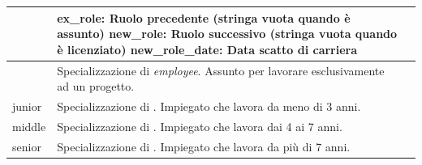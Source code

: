 \begin{longtable}{@{}| p{} | p{} | p{} |}
\begin{minipage}[t]{0.4\textwidth}
	                       \end{minipage}
	                     & \begin{minipage}[t]{0.3\textwidth}
		                       \raggedright
		                       \textbf{ex\_role}: Ruolo precedente (stringa vuota quando è assunto)\sskip
		                       \textbf{new\_role}: Ruolo successivo (stringa vuota quando è licenziato)\sskip
		                       \textbf{new\_role\_date}: Data scatto di carriera
	                       \end{minipage}                                     \\[90pt]
	\hline
	\projectsalaried     & \begin{minipage}[t]{0.4\textwidth}
		                       \raggedright
		                       Specializzazione di \textit{employee}. Assunto per lavorare esclusivamente ad un progetto.
	                       \end{minipage}
	                     &                                                                                                                   \\[25pt]
	\hline
	junior               & \begin{minipage}[t]{0.4\textwidth}
		                       \raggedright
		                       Specializzazione di \textit{\baseemp}. Impiegato che lavora da meno di 3 anni.
	                       \end{minipage}
	                     &                                                                                                                   \\[25pt]
	\hline
	middle               & \begin{minipage}[t]{0.4\textwidth}
		                       \raggedright
		                       Specializzazione di \textit{\baseemp}. Impiegato che lavora dai 4 ai 7 anni.
	                       \end{minipage}
	                     &                                                                                                                   \\[15pt]
	\hline
	senior               & \begin{minipage}[t]{0.4\textwidth}
		                       \raggedright
		                       Specializzazione di \textit{\baseemp}. Impiegato che lavora da più di 7 anni.
	                       \end{minipage}
	                     &                                                                                                                   \\[15pt]

\end{longtable}
